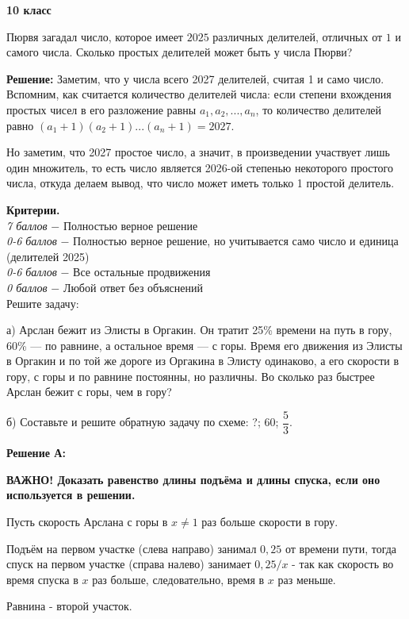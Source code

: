 \centerline{\bf \Large  10 класс}

 Пюрвя загадал число, которое имеет $2025$ различных делителей, отличных от $1$ и самого числа. Сколько простых делителей может быть у числа Пюрви?

\textbf{Решение:} Заметим, что у числа всего 2027 делителей, считая 1 и само число. Вспомним, как считается количество делителей числа:
если степени вхождения простых чисел в его разложение равны $a_1, a_2, ..., a_n$, то количество делителей равно
$(a_1+1)(a_2+1)...(a_n+1)=2027$.

Но заметим, что 2027 простое число, а значит, в произведении участвует лишь один множитель, то есть число является 2026-ой степенью некоторого простого числа, откуда делаем вывод, что число может иметь только 1 простой делитель.


\textbf{Критерии.} \\
\textit{7 баллов} $-$ Полностью верное решение\\
\textit{0-6 баллов} $-$ Полностью верное решение, но учитывается само число и единица (делителей 2025)\\
\textit{0-6 баллов} $-$ Все остальные продвижения\\
\textit{0 баллов} $-$ Любой ответ без объяснений\\

 Решите задачу:

а) Арслан бежит из Элисты в Оргакин. Он тратит 25\% времени на путь в гору, 60\% — по равнине, а остальное время — с горы. Время его движения из Элисты в Оргакин и по той же дороге из Оргакина в Элисту одинаково, а его скорости в гору, с горы и по равнине постоянны, но различны. Во сколько раз быстрее Арслан бежит с горы, чем в гору?

б) Составьте и решите обратную задачу по схеме: ?; 60; $\dfrac{5}{3}$.

\textbf{Решение А:}

\textbf{ВАЖНО! Доказать равенство длины подъёма и длины спуска, если оно используется в решении.}

Пусть скорость Арслана с горы в $x \neq 1$ раз больше скорости в гору.

Подъём на первом участке (слева направо) занимал $0,25$ от времени пути, тогда спуск на первом участке (справа налево) занимает $0,25 / x$ - так как скорость во время спуска в $x$ раз больше, следовательно, время в $x$ раз меньше.

Равнина - второй участок.

